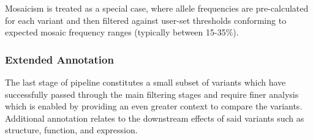 Mosaicism is treated as a special case, where allele frequencies are pre-calculated for each variant and then filtered against user-set thresholds conforming to expected mosaic frequency ranges (typically between 15-35\%).




\subsubsection{Extended Annotation}

The last stage of pipeline constitutes a small subset of variants which have successfully passed through the main filtering stages and require finer analysis which is enabled by providing an even greater context to compare the variants. Additional annotation relates to the downstream effects of said variants such as structure, function, and expression.

\begin{itemize}
\end{itemize}



